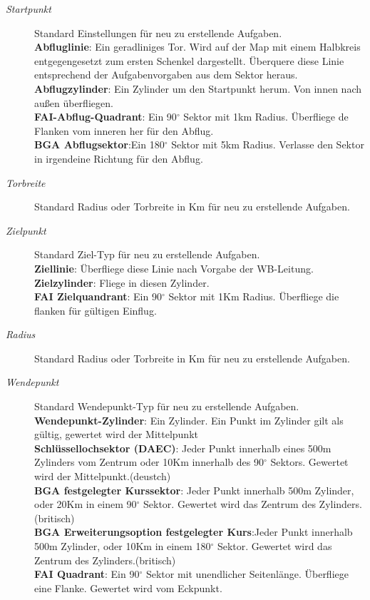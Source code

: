 \begin{description}
\item[\textit{Startpunkt}] Standard Einstellungen für neu zu erstellende Aufgaben.\\
{\bf  Abfluglinie}: Ein geradliniges Tor. Wird auf der Map mit einem Halbkreis entgegengesetzt zum ersten Schenkel
dargestellt. Überquere diese Linie entsprechend der Aufgabenvorgaben aus dem Sektor heraus.\\
{\bf  Abflugzylinder}: Ein Zylinder um den Startpunkt herum. Von innen nach außen überfliegen.\\
{\bf FAI-Abflug-Quadrant}: Ein 90$^\circ$ Sektor mit 1km Radius. Überfliege de Flanken vom inneren her für den Abflug.\\
{\bf  BGA Abflugsektor}:Ein 180$^\circ$ Sektor mit 5km Radius. Verlasse den Sektor in irgendeine Richtung für den Abflug.
\item[\textit{Torbreite}] Standard Radius oder Torbreite in Km für neu zu erstellende Aufgaben.
\item[\textit{Zielpunkt}] Standard Ziel-Typ für neu zu erstellende Aufgaben.\\
{\bf Ziellinie}: Überfliege diese Linie nach Vorgabe der WB-Leitung.\\
{\bf Zielzylinder}: Fliege in diesen Zylinder.\\
{\bf FAI Zielquandrant}: Ein 90$^\circ$ Sektor mit 1Km Radius. Überfliege die flanken für gültigen Einflug.
\item[\textit{Radius}] Standard Radius oder Torbreite in Km für neu zu erstellende Aufgaben.
\item[\textit{Wendepunkt}] Standard Wendepunkt-Typ für neu zu erstellende Aufgaben.\\
{\bf Wendepunkt-Zylinder}: Ein Zylinder. Ein Punkt im Zylinder gilt als gültig, gewertet wird der Mittelpunkt\\
{\bf Schlüssellochsektor (DAEC)}: Jeder Punkt innerhalb eines 500m Zylinders vom Zentrum oder 10Km innerhalb
des 90$^\circ$ Sektors. Gewertet wird der Mittelpunkt.(deustch)\\
{\bf BGA festgelegter Kurssektor}: Jeder Punkt innerhalb 500m Zylinder, oder 20Km  in einem 90$^\circ$ Sektor.
Gewertet wird das Zentrum des Zylinders.(britisch)\\
{\bf BGA Erweiterungsoption festgelegter Kurs}:Jeder Punkt innerhalb 500m Zylinder, oder 10Km  in einem 180$^\circ$ Sektor.
Gewertet wird das Zentrum des Zylinders.(britisch)\\
{\bf FAI Quadrant}: Ein 90$^\circ$ Sektor mit unendlicher Seitenlänge. Überfliege eine Flanke. Gewertet wird vom Eckpunkt.

\end{description}
